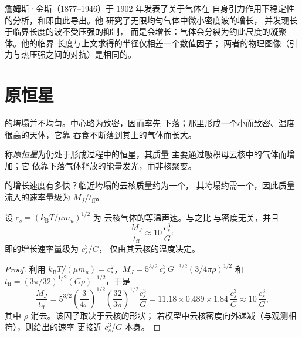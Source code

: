 \begin{history}[詹姆斯·金斯]
詹姆斯·金斯（1877--1946）于 1902 年发表了关于气体在
自身引力作用下稳定性的分析，和即由此导出。他
研究了无限均匀气体中微小密度波的增长，
并发现长于临界长度的波不受压强的抑制，
而是会增长：气体会分裂为约此尺度的凝聚体。他的临界
长度与上文求得的半径仅相差一个数值因子；
两者的物理图像（引力与热压强之间的对抗）是相同的。
\end{history}

\section{原恒星}

的垮塌并不均匀。中心略为致密，因而率先
下落；那里形成一个小而致密、温度很高的天体，它靠
吞食不断落到其上的气体而长大。

\begin{definition}[原恒星]\label{def:b2:ism-star-formation:protostar}
称\emph{原恒星}为仍处于形成过程中的恒星，其质量
主要通过吸积母云核中的气体而增加；它
依靠下落气体释放的能量发光，而非核聚变。
\end{definition}

的增长速度有多快？临近垮塌的云核质量约为一个，
其垮塌约需一个，因此质量流入的速率量级为
$M_J/t_{\mathrm{ff}}$。

\begin{proposition}[原恒星的吸积率]
\label{prop:b2:ism-star-formation:accretion}
设 $c_s = (k_{\mathrm B}T/\mu m_u)^{1/2}$ 为
云核气体的等温声速。与之比
与密度无关，并且
\[
  \frac{M_J}{t_{\mathrm{ff}}} \approx 10\,\frac{c_s^3}{G}:
\]
即的增长速率量级为 $c_s^3/G$，
仅由其云核的温度决定。
\end{proposition}

\begin{proof}
利用 $k_{\mathrm B}T/(\mu m_u) = c_s^2$，$M_J = 5^{3/2}\,c_s^3\,G^{-3/2}
(3/4\pi\rho)^{1/2}$ 和 $t_{\mathrm{ff}} = (3\pi/32)^{1/2}(G\rho)^{-1/2}$，于是
\[
  \frac{M_J}{t_{\mathrm{ff}}} = 5^{3/2}\left(\frac{3}{4\pi}\right)^{1/2}
  \left(\frac{32}{3\pi}\right)^{1/2}\frac{c_s^3}{G}
  = 11.18\times0.489\times1.84\,\frac{c_s^3}{G} \approx 10\,\frac{c_s^3}{G},
\]
其中 $\rho$ 消去。该因子取决于云核的形状；
若模型中云核密度向外递减（与观测相符），则给出的速率
更接近 $c_s^3/G$ 本身。
\end{proof}

